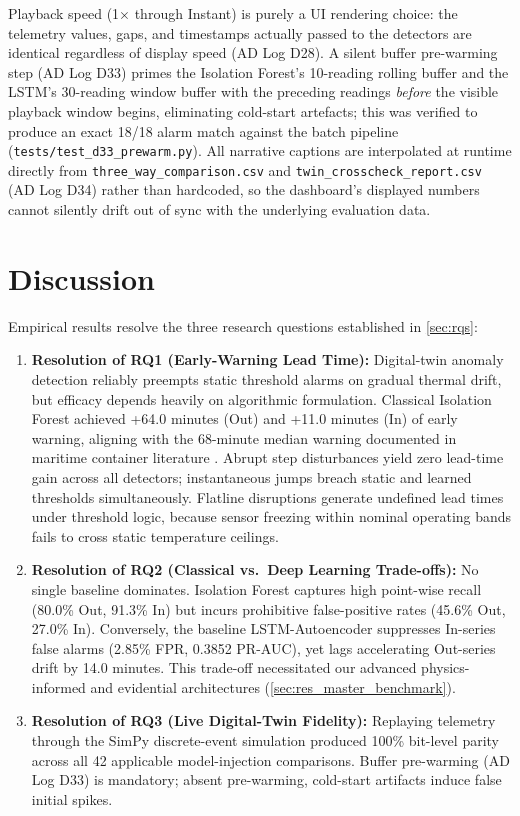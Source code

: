 \documentclass[11pt,a4paper,oneside]{report}
\begin{document}
Playback speed (1$\times$ through Instant) is purely a UI rendering choice: the telemetry values, gaps, and timestamps actually passed to the detectors are identical regardless of display speed (AD Log D28). A silent buffer pre-warming step (AD Log D33) primes the Isolation Forest's 10-reading rolling buffer and the LSTM's 30-reading window buffer with the preceding readings \emph{before} the visible playback window begins, eliminating cold-start artefacts; this was verified to produce an exact 18/18 alarm match against the batch pipeline (\texttt{tests/test\_d33\_prewarm.py}). All narrative captions are interpolated at runtime directly from \texttt{three\_way\_comparison.csv} and \texttt{twin\_crosscheck\_report.csv} (AD Log D34) rather than hardcoded, so the dashboard's displayed numbers cannot silently drift out of sync with the underlying evaluation data.

\chapter{Discussion}
\label{chap:discussion}

Empirical results resolve the three research questions established in \cref{sec:rqs}:

\begin{enumerate}[leftmargin=*,itemsep=6pt]
    \item \textbf{Resolution of RQ1 (Early-Warning Lead Time):} Digital-twin anomaly detection reliably preempts static threshold alarms on gradual thermal drift, but efficacy depends heavily on algorithmic formulation. Classical Isolation Forest achieved +64.0 minutes (Out) and +11.0 minutes (In) of early warning, aligning with the 68-minute median warning documented in maritime container literature \parencite{vuksic2026early}. Abrupt step disturbances yield zero lead-time gain across all detectors; instantaneous jumps breach static and learned thresholds simultaneously. Flatline disruptions generate undefined lead times under threshold logic, because sensor freezing within nominal operating bands fails to cross static temperature ceilings.
    \item \textbf{Resolution of RQ2 (Classical vs.\ Deep Learning Trade-offs):} No single baseline dominates. Isolation Forest captures high point-wise recall (80.0\% Out, 91.3\% In) but incurs prohibitive false-positive rates (45.6\% Out, 27.0\% In). Conversely, the baseline LSTM-Autoencoder suppresses In-series false alarms (2.85\% FPR, 0.3852 PR-AUC), yet lags accelerating Out-series drift by 14.0 minutes. This trade-off necessitated our advanced physics-informed and evidential architectures (\cref{sec:res_master_benchmark}).
    \item \textbf{Resolution of RQ3 (Live Digital-Twin Fidelity):} Replaying telemetry through the SimPy discrete-event simulation produced 100\% bit-level parity across all 42 applicable model-injection comparisons. Buffer pre-warming (AD Log D33) is mandatory; absent pre-warming, cold-start artifacts induce false initial spikes.
\end{enumerate}
\end{document}
